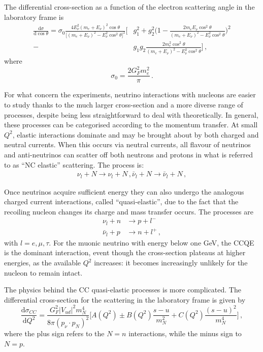  The differential cross-section as a function of the electron scattering angle in the laboratory frame is
 \begin{equation}
 \begin{split}
   \frac{\mathrm{d}\sigma}{\mathrm{d}\cos\theta} = \sigma_0 \frac{4 E_\nu^2 (m_e+E_\nu)^2 \cos \theta}%
   {\big[(m_e+E_\nu)^2-E_\nu^2 \cos^2 \theta \big]^2} \bigg[&g_1^2 + g_2^2\bigg(1 - %
   \frac{2 m_e E_\nu \cos^2 \theta}{(m_e+E_\nu)^2-E_\nu^2 \cos^2 \theta} \bigg)^2 \\
   - &g_1 g_2 \frac{2m_e^2 \cos^2 \theta}{(m_e+E_\nu)^2-E_\nu^2 \cos^2 \theta} \bigg]\,,
 \end{split}
 \end{equation}
 where 
 \begin{equation}
   \sigma_0 = \frac{2 G_F^2 m_e^2}{\pi}\,.
 \end{equation}

 For what concern the experiments, neutrino interactions with nucleons are easier to study thanks to the %
 much larger cross-section and a more diverse range of processes, despite being less straightforward to %
 deal with theoretically.
 In general, these processes can be categorised according to the momentum transfer.
 At small $Q^2$, elastic interactions dominate and may be brought about by both charged and neutral currents.
 When this occurs via neutral currents, all flavour of neutrinos and anti-neutrinos can scatter off %
 both neutrons and protons in what is referred to as ``NC elastic'' scattering.
 The process is:
 \begin{align}
   \nu_l + N \rightarrow \nu_l + N\,,
   \bar\nu_l + N \rightarrow \bar\nu_l + N\,,
 \end{align}

 Once neutrinos acquire sufficient energy they can also undergo the analogous charged current interactions, %
 called ``quasi-elastic'', due to the fact that the recoiling nucleon changes its charge and mass transfer occurs.
 The processes are
 \begin{align}
   \nu_l + n &\rightarrow p + l^-\,\\
   \bar\nu_l + p &\rightarrow n + l^+\,,
 \end{align}
 with $l=e, \mu, \tau$.
 For the muonic neutrino with energy below one GeV, the CCQE is the dominant interaction, event though the %
 cross-section plateaus at higher energies, as the available $Q^2$ increases: it becomes increasingly unlikely %
 for the nucleon to remain intact.

 The physics behind the CC quasi-elastic processes is more complicated.
 The differential cross-section for the scattering in the laboratory frame is given by
 \begin{equation}
   \label{eq:cc_xsec_q}
   \frac{\mathrm{d} \sigma_{CC}}{\mathrm{d}Q^2} = \frac{G_F^2 |V_{ud}|^2 m_N^4}{8\pi (p_\nu \cdot p_N)^2} %
   \bigg [A(Q^2) \pm B(Q^2) \frac{s-u}{m_N^2} + C(Q^2) \frac{(s-u)^2}{m_N^4} \bigg]\,,
 \end{equation}
 where the plus sign refers to the $N = n$ interactions, while the minus sign to $N = p$.

